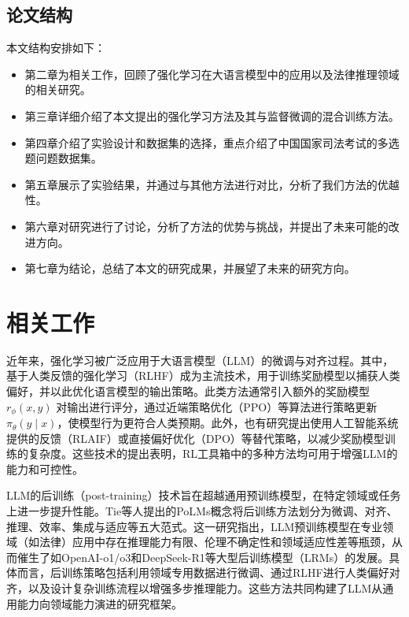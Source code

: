 \documentclass{pkuthesis}
\begin{document}
\subsection{论文结构}
本文结构安排如下：
\begin{itemize}
    \item 第二章为相关工作，回顾了强化学习在大语言模型中的应用以及法律推理领域的相关研究。
    \item 第三章详细介绍了本文提出的强化学习方法及其与监督微调的混合训练方法。
    \item 第四章介绍了实验设计和数据集的选择，重点介绍了中国国家司法考试的多选题问题数据集。
    \item 第五章展示了实验结果，并通过与其他方法进行对比，分析了我们方法的优越性。
    \item 第六章对研究进行了讨论，分析了方法的优势与挑战，并提出了未来可能的改进方向。
    \item 第七章为结论，总结了本文的研究成果，并展望了未来的研究方向。
\end{itemize}

\section{相关工作}
近年来，强化学习被广泛应用于大语言模型（LLM）的微调与对齐过程。其中，基于人类反馈的强化学习（RLHF）成为主流技术，用于训练奖励模型以捕获人类偏好，并以此优化语言模型的输出策略。此类方法通常引入额外的奖励模型 $r_{\phi}(x, y)$ 对输出进行评分，通过近端策略优化（PPO）等算法进行策略更新 $\pi_{\theta}(y \mid x)$，使模型行为更符合人类预期。此外，也有研究提出使用人工智能系统提供的反馈（RLAIF）或直接偏好优化（DPO）等替代策略，以减少奖励模型训练的复杂度。这些技术的提出表明，RL工具箱中的多种方法均可用于增强LLM的能力和可控性。

LLM的后训练（post-training）技术旨在超越通用预训练模型，在特定领域或任务上进一步提升性能。Tie等人提出的PoLMs概念将后训练方法划分为微调、对齐、推理、效率、集成与适应等五大范式。这一研究指出，LLM预训练模型在专业领域（如法律）应用中存在推理能力有限、伦理不确定性和领域适应性差等瓶颈，从而催生了如OpenAI-o1/o3和DeepSeek-R1等大型后训练模型（LRMs）的发展。具体而言，后训练策略包括利用领域专用数据进行微调、通过RLHF进行人类偏好对齐，以及设计复杂训练流程以增强多步推理能力。这些方法共同构建了LLM从通用能力向领域能力演进的研究框架。
\end{document}
